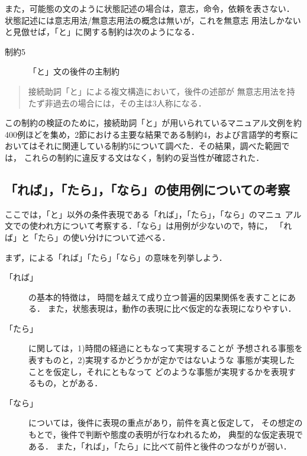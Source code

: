 また，可能態の文のように状態記述の場合は，意志，命令，依頼を表さない．
状態記述には意志用法/無意志用法の概念は無いが，これを無意志
用法しかないと見倣せば，「と」に関する制約は次のようになる．

\begin{description}
\item[制約5] 「と」文の後件の{\dg 主}制約  
\end{description}
\begin{quote}
  接続助詞「と」による複文構造において，後件の述部が
  無意志用法を持たず非過去の場合には，その{\dg 主}は3人称になる．
\end{quote}

この制約の検証のために，接続助詞「と」が用いられているマニュアル文例を約
400例ほどを集め，2節における主要な結果である制約4，および言語学的考察に
おいてはそれに関連している制約5について調べた．その結果，調べた範囲では，
これらの制約に違反する文はなく，制約の妥当性が確認された．

\subsection{「れば」，「たら」，「なら」の使用例についての考察}

ここでは，「と」以外の条件表現である「れば」，「たら」，「なら」のマニュ
アル文での使われ方について考察する．「なら」は用例が少ないので，特に，
「れば」と「たら」の使い分けについて述べる．

まず，\cite{masu}による「れば」「たら」「なら」の意味を列挙しよう．
\begin{description}
\item[「れば」]の基本的特徴は，
時間を越えて成り立つ普遍的因果関係を表すことにある．
また，状態表現は，動作の表現に比べ仮定的な表現になりやすい．
\item[「たら」]に関しては，1)時間の経過にともなって実現することが
予想される事態を表すものと，2)実現するかどうかが定かではないような
事態が実現したことを仮定し，それにともなって
どのような事態が実現するかを表現するもの，とがある．
\item[「なら」]については，後件に表現の重点があり，前件を真と仮定して，
その想定のもとで，後件で判断や態度の表明が行なわれるため，
典型的な仮定表現である．
また，「れば」，「たら」に比べて前件と後件のつながりが弱い．
\end{description}

